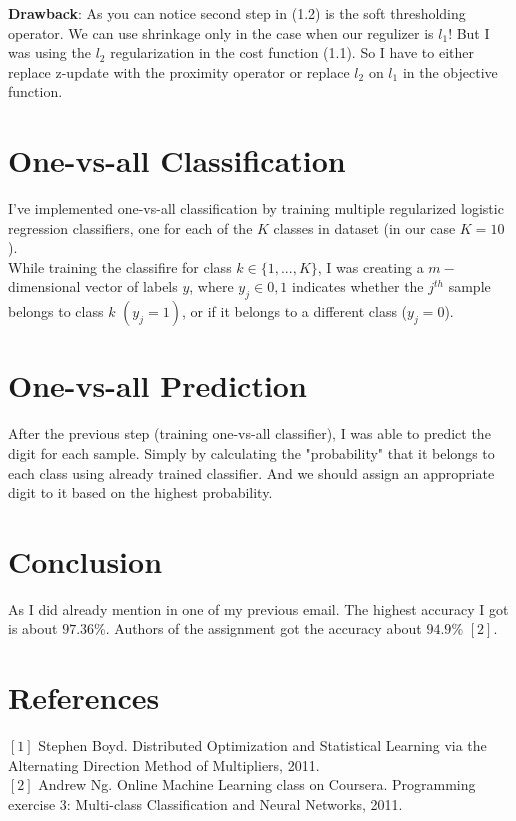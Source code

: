\documentclass[paper=a4, fontsize=11pt]{scrartcl} %
\numberwithin{equation}{section} %
\numberwithin{figure}{section} %
\numberwithin{table}{section} %
\begin{document}
\textbf{Drawback}: As you can notice second step in (1.2) is the soft thresholding operator. We can use shrinkage only in the case when our regulizer is $l_1$! But I was using the $l_2$ regularization in the cost function (1.1). So I have to either replace z-update with the proximity operator or replace $l_2$ on $l_1$ in the objective function.



\section{One-vs-all Classification}

	I've implemented one-vs-all classification by training multiple regularized logistic regression classifiers, one for each of the $K$ classes in dataset (in our case $K=10$). \\

While training the classifire for class $k\in\{1,...,K\}$, I was creating a $m-$dimensional vector of labels $y$, where $y_j \in 0,1$ indicates whether the $j^{th}$ sample belongs to class $k$ $(y_j = 1)$, or if it belongs to a different class ($y_j=0$). \\

\section{One-vs-all Prediction}

	After the previous step (training one-vs-all classifier), I was able to predict the digit for each sample. Simply by calculating the "probability" that it belongs to each class using already trained classifier. And we should assign an appropriate digit to it based on the highest probability.  \\


\section{Conclusion}

As I did already mention in one of my previous email. The highest accuracy I got is about $97.36\%$. Authors of the assignment got the accuracy about $94.9\%$ $[2]$.

\section{References}

$[1]$ Stephen Boyd. Distributed Optimization and Statistical Learning via the Alternating Direction Method of Multipliers, 2011.\\
$[2]$ Andrew Ng. Online Machine Learning class on Coursera. Programming exercise 3: Multi-class Classification and Neural Networks, 2011. \\
\end{document}
